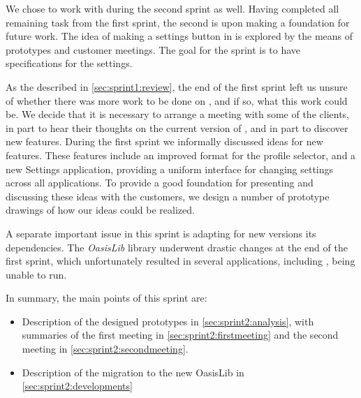 We chose to work with \launcher during the second sprint as well.
Having completed all remaining task from the first sprint, the second is upon making a foundation for future work.
The idea of making a settings button in \launcher is explored by the means of prototypes and customer meetings.
The goal for the sprint is to have specifications for the settings.

As the described in \cref{sec:sprint1:review}, the end of the first sprint left us unsure of whether there was more work to be done on \launcher, and if so, what this work could be. 
We decide that it is necessary to arrange a meeting with some of the clients, in part to hear their thoughts on the current version of \launcher, and in part to discover new features.
During the first sprint we informally discussed ideas for new features.
These features include an improved format for the profile selector, and a new Settings application, providing a uniform interface for changing settings across all applications. 
To provide a good foundation for presenting and discussing these ideas with the customers, we design a number of prototype drawings of how our ideas could be realized.

A separate important issue in this sprint is adapting \launcher for new versions its dependencies. 
The \textit{OasisLib} library underwent drastic changes at the end of the first sprint, which unfortunately resulted in several applications, including \launcher, being unable to run.

In summary, the main points of this sprint are:

\begin{itemize}
\item Description of the designed prototypes in \cref{sec:sprint2:analysis}, with summaries of the first meeting in \cref{sec:sprint2:firstmeeting} and the second meeting in \cref{sec:sprint2:secondmeeting}.
\item Description of the migration to the new OasisLib in \cref{sec:sprint2:developments}
\end{itemize}